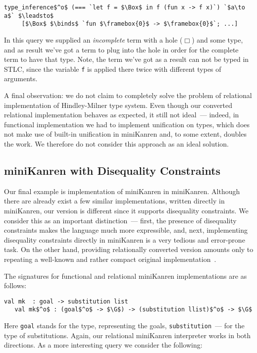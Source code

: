 \begin{lstlisting}[basicstyle=\small]
   type_inference$^o$ (=== `let f = $\Box$ in f (fun x -> f x)`) `$a\to a$` $\leadsto$ 
     [$\Box$ $\binds$ `fun $\framebox{0}$ -> $\framebox{0}$`; ...]
\end{lstlisting}

In this query we supplied an \emph{incomplete} term with a hole ($\Box$) and some type, and as result we've got a term to plug into the hole 
in order for the complete term to have that type. Note, the term we've got as a result can not be typed in STLC, since the variable \lstinline|f|
is applied there twice with different types of arguments.

A final observation: we do not claim to completely solve the problem of relational implementation of Hindley-Milner type system. Even though our converted
relational implementation behaves as expected, it still not ideal~--- indeed, in functional implementation we had to implement unification on types, 
which does not make use of built-in unification in miniKanren and, to some extent, doubles the work. We therefore do not consider this approach as an ideal solution.

\subsection{miniKanren with Disequality Constraints}

Our final example is implementation of miniKanren in miniKanren. Although there are already exist a few similar implementations, written directly in miniKanren, 
our version is different since it supports disequality constraints. We consider this as an important distinction~--- first, the presence of disequality
constraints makes the language much more expressible, and, next, implementing disequality constraints directly in miniKanren is a very tedious
and error-prone task. On the other hand, providing relationally converted version amounts only to repeating a well-known and rather compact original 
implementation~\cite{CKanren}.

The signatures for functional and relational miniKanren implementations are as follows:

\begin{lstlisting}[basicstyle=\small]
   val mk  : goal -> substitution list
   val mk$^o$ : (goal$^o$ -> $\G$) -> (substitution llist)$^o$ -> $\G$
\end{lstlisting}

Here \lstinline|goal| stands for the type, representing the goals, \lstinline|substitution|~--- for the type of substitutions. Again, 
our relational miniKanren interpreter works in both directions. As a more interesting query we consider the following:

